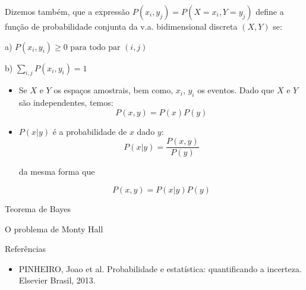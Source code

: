 \documentclass{beamer}
\begin{document}
\begin{frame}
	Dizemos também, que a expressão $P(x_i, y_j) = P(X = x_i , Y = y_j)$ define a função de probabilidade conjunta da
	v.a. bidimensional discreta $( X, Y )$ se:

	a) $P(x_i, y_i) \geq 0 \text{ para todo par }(i,j)$
	
	b) $\sum\limits_{i,j} P(x_i, y_i) = 1 $

	\begin{itemize}
	\item Se $X$ e $Y$ os espaços amostrais, bem como, $x_i$, $y_i$ os eventos. Dado que $X$ e $Y$ são independentes, temos:
	\begin{equation}
		P(x,y) = P(x)P(y)
	\end{equation}
	\item $P(x|y)$ é a probabilidade de $x$ dado $y$:
	\begin{equation}
		P(x|y) = \frac{P(x,y)}{P(y)}
	\end{equation}
	
	da mesma forma que

	\begin{equation}
		P(x,y) = P(x|y)P(y)
	\end{equation}
\end{itemize}
\end{frame}


\begin{frame}[c]{Teorema de Bayes}
\end{frame}


\begin{frame}[c]{O problema de Monty Hall}
\end{frame}


\begin{frame}[t]{Referências}
    \begin{itemize}
        \item PINHEIRO, Joao et al. Probabilidade e estatística: quantificando a incerteza. Elsevier Brasil, 2013.
        
    \end{itemize}
\end{frame}
\end{document}
